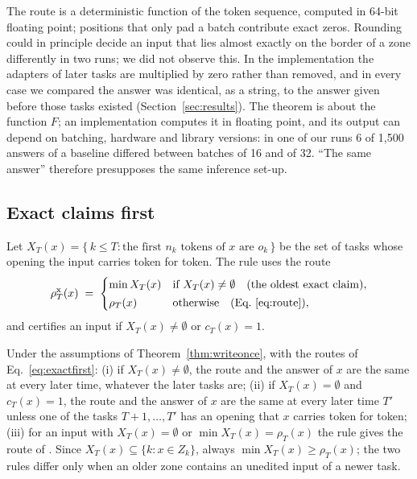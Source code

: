 \begin{remark}
\label{rem:exactness}
The route is a deterministic function of the token sequence, computed in 64-bit floating point;
positions that only pad a batch contribute exact zeros. Rounding could in principle decide an
input that lies almost exactly on the border of a zone differently in two runs; we did not observe
this. In the implementation the adapters of later tasks are multiplied by zero rather than removed, and in every case we compared the answer was identical, as a string, to the answer given before those tasks existed (Section~\ref{sec:results}). The theorem is about the function $F$; an implementation computes it in floating point, and its output can depend on batching, hardware and library versions: in one of our runs 6 of 1{,}500 answers of a baseline differed between batches of 16 and of 32. ``The same answer'' therefore presupposes the same inference set-up.
\end{remark}

\subsection{Exact claims first}
\begin{definition}
Let $X_T(x) = \{\, k \le T : \text{the first } n_k \text{ tokens of } x \text{ are } o_k \,\}$ be the
set of tasks whose opening the input carries token for token. The rule \exactfirst{} uses the route
\begin{equation}
  \rho^{\mathrm{x}}_T(x) \;=\;
  \begin{cases}
    \min X_T(x) & \text{if } X_T(x) \neq \emptyset \quad \text{(the oldest exact claim)}, \\[2pt]
    \rho_T(x) & \text{otherwise} \quad \text{(Eq.~\ref{eq:route})} ,
  \end{cases}
  \label{eq:exactfirst}
\end{equation}
and certifies an input if $X_T(x) \neq \emptyset$ or $c_T(x) = 1$.
\end{definition}

\begin{proposition}
\label{prop:exactfirst}
Under the assumptions of Theorem~\ref{thm:writeonce}, with the routes of Eq.~\eqref{eq:exactfirst}:
(i) if $X_T(x) \neq \emptyset$, the route and the answer of $x$ are the same at every later time,
whatever the later tasks are; (ii) if $X_T(x) = \emptyset$ and $c_T(x) = 1$, the route and the answer
of $x$ are the same at every later time $T'$ unless one of the tasks $T+1, \dots, T'$ has an opening
that $x$ carries token for token; (iii) for an input with $X_T(x) = \emptyset$ or
$\min X_T(x) = \rho_T(x)$ the rule gives the route of \cert{}. Since $X_T(x) \subseteq \{k : x \in Z_k\}$, always
$\min X_T(x) \ge \rho_T(x)$; the two rules differ only when an older zone contains an unedited input of a newer task.
\end{proposition}

